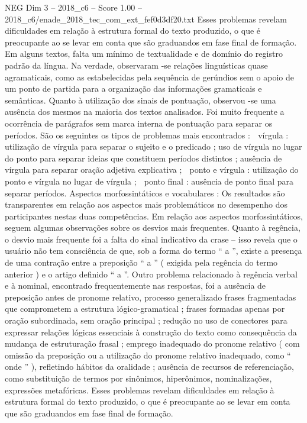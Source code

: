 \begin{textsample}{NEG Dim 3 – 2018\_c6 – Score 1.00 – 2018\_c6/enade\_2018\_tec\_com\_ext\_fef0d3df20.txt}
Esses problemas revelam dificuldades em relação à estrutura formal do texto produzido, o que é preocupante ao se levar em conta que são graduandos em fase final de formação.
Em alguns textos, falta um mínimo de textualidade e de domínio do registro padrão da língua.
Na verdade, observaram -se relações linguísticas quase agramaticais, como as estabelecidas pela sequência de gerúndios sem o apoio de um ponto de partida para a organização das informações gramaticais e semânticas.
Quanto à utilização dos sinais de pontuação, observou -se uma ausência dos mesmos na maioria dos textos analisados.
Foi muito frequente a ocorrência de parágrafos sem marca interna de pontuação para separar os períodos.
São os seguintes os tipos de problemas mais encontrados :  vírgula : utilização de vírgula para separar o sujeito e o predicado ; uso de vírgula no lugar do ponto para separar ideias que constituem períodos distintos ; ausência de vírgula para separar oração adjetiva explicativa ;  ponto e vírgula : utilização do ponto e vírgula no lugar de vírgula ;  ponto final : ausência de ponto final para separar períodos.
Aspectos morfossintáticos e vocabulares : Os resultados são transparentes em relação aos aspectos mais problemáticos no desempenho dos participantes nestas duas competências.
Em relação aos aspectos morfossintáticos, seguem algumas observações sobre os desvios mais frequentes.
Quanto à regência, o desvio mais frequente foi a falta do sinal indicativo da crase – isso revela que o usuário não tem consciência de que, sob a forma do termo “ a ”, existe a presença de uma contração entre a preposição “ a ” ( exigida pela regência do termo anterior ) e o artigo definido “ a ”.
Outro problema relacionado à regência verbal e à nominal, encontrado frequentemente nas respostas, foi a ausência de preposição antes de pronome relativo, processo generalizado frases fragmentadas que comprometem a estrutura lógico-gramatical ; frases formadas apenas por oração subordinada, sem oração principal ; redução no uso de conectores para expressar relações lógicas essenciais à construção do texto como consequência da mudança de estruturação frasal ; emprego inadequado do pronome relativo ( com omissão da preposição ou a utilização do pronome relativo inadequado, como “ onde ” ), refletindo hábitos da oralidade ; ausência de recursos de referenciação, como substituição de termos por sinônimos, hiperônimos, nominalizações, expressões metafóricas.
Esses problemas revelam dificuldades em relação à estrutura formal do texto produzido, o que é preocupante ao se levar em conta que são graduandos em fase final de formação.

\end{textsample}
